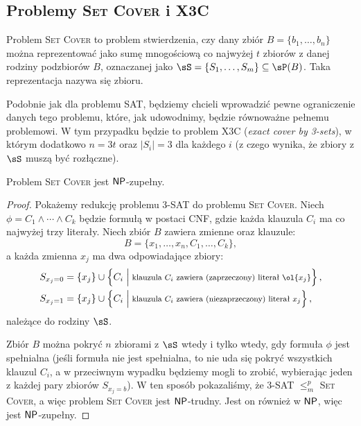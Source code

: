 \subsection{Problemy \textsc{Set Cover} i X3C}

Problem \textsc{Set Cover} to problem stwierdzenia, czy dany zbiór $B = \{b_1, \ldots, b_n\}$ można reprezentować jako sumę mnogościową co najwyżej $t$ zbiorów z danej rodziny podzbiorów $B$, oznaczanej jako $\sS = \{S_1, \ldots, S_m\} \subseteq \sP(B)$.
Taka reprezentacja nazywa się  zbioru.

Podobnie jak dla problemu SAT, będziemy chcieli wprowadzić pewne ograniczenie danych tego problemu, które, jak udowodnimy, będzie równoważne pełnemu problemowi. W tym przypadku będzie to problem X3C (\textit{exact cover by 3-sets}), w którym dodatkowo $n = 3t$ oraz $|S_i| = 3$ dla każdego $i$ (z czego wynika, że zbiory z $\sS$ muszą być rozłączne).

\begin{theorem}\label{t:Set Cover}
    Problem \textsc{Set Cover} jest $\textsf{NP}$-zupełny.
\end{theorem}
\begin{proof}
    Pokażemy redukcję problemu 3-SAT do problemu \textsc{Set Cover}. Niech $\phi = C_1 \land \cdots \land C_k$ będzie formułą w postaci CNF, gdzie każda klauzula $C_i$ ma co najwyżej trzy literały. Niech zbiór $B$ zawiera zmienne oraz klauzule:
    \[ B = \{x_1, \ldots, x_n, C_1, \ldots, C_k\}, \]
    a każda zmienna $x_j$ ma dwa odpowiadające zbiory:
    \begin{align*}
        S_{x_j = 0} &= \{x_j\} \cup \left\{C_i \Bigm| \text{\footnotesize klauzula $C_i$ zawiera (zaprzeczony) literał $\ol{x_j}$}\right\}, \\
        S_{x_j = 1} &= \{x_j\} \cup \left\{C_i \Bigm| \text{\footnotesize klauzula $C_i$ zawiera (niezaprzeczony) literał $x_j$}\right\},
    \end{align*}
    należące do rodziny $\sS$.

    Zbiór $B$ można pokryć $n$ zbiorami z $\sS$ wtedy i tylko wtedy, gdy formuła $\phi$ jest spełnialna (jeśli formuła nie jest spełnialna, to nie uda się pokryć wszystkich klauzul $C_i$, a w przeciwnym wypadku będziemy mogli to zrobić, wybierając jeden z każdej pary zbiorów $S_{x_j = b}$). W ten sposób pokazaliśmy, że 3-SAT $\leq_m^p$ \textsc{Set Cover}, a więc problem \textsc{Set Cover} jest $\textsf{NP}$-trudny. Jest on również w $\textsf{NP}$, więc jest $\textsf{NP}$-zupełny.
\end{proof}

